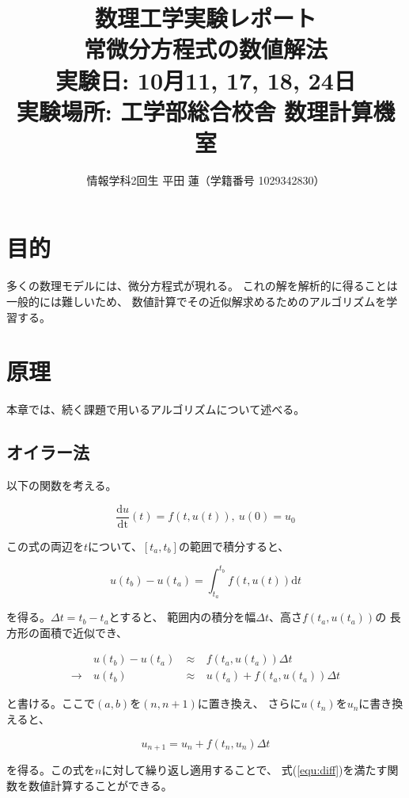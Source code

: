 \documentclass[a4j, titlepage]{jsarticle}
\title{
    数理工学実験レポート \\
    常微分方程式の数値解法 \\
    \large{実験日: 10月11, 17, 18, 24日} \\
    \large{実験場所: 工学部総合校舎 数理計算機室}
}
\author{情報学科2回生 平田 蓮（学籍番号 1029342830）}
\begin{document}
\maketitle

\section{目的}
    多くの数理モデルには、微分方程式が現れる。
    これの解を解析的に得ることは一般的には難しいため、
    数値計算でその近似解求めるためのアルゴリズムを学習する。

\section{原理}
    本章では、続く課題で用いるアルゴリズムについて述べる。

    \subsection{オイラー法}
        以下の関数を考える。

        \begin{equation}
            \frac{\mathrm{d}u}{\mathrm{dt}}(t) = f(t, u(t)), \ u(0) = u_0 \label{equ:diff}
        \end{equation}

        この式の両辺を$t$について、$[t_a, t_b]$の範囲で積分すると、
        
        \begin{equation*}
            u(t_b) - u(t_a) = \int^{t_b}_{t_a}f(t, u(t))\mathrm{d}t
        \end{equation*}

        を得る。$\Delta t = t_b - t_a$とすると、
        範囲内の積分を幅$\Delta t$、高さ$f(t_a, u(t_a))$の
        長方形の面積で近似でき、

        \begin{alignat*}{2}
            & u(t_b) - u(t_a) & \ \approx \ & f(t_a, u(t_a))\Delta t \\
            \rightarrow \ & u(t_b) & \ \approx \ & u(t_a) + f(t_a, u(t_a))\Delta t
        \end{alignat*}

        と書ける。ここで$(a, b)$を$(n, n + 1)$に置き換え、
        さらに$u(t_n)$を$u_n$に書き換えると、

        \begin{equation}
            u_{n + 1} = u_n + f(t_n, u_n)\Delta t
        \end{equation}

        を得る。この式を$n$に対して繰り返し適用することで、
        式(\ref{equ:diff})を満たす関数を数値計算することができる。

\begin{thebibliography}{99}
\end{thebibliography}
\end{document}
